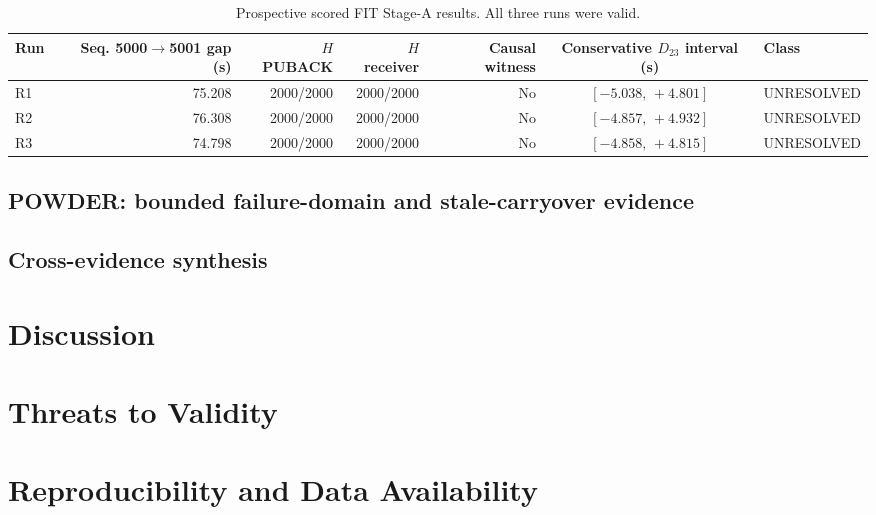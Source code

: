 \documentclass[journal]{IEEEtran}
\begin{document}
\begin{table}[t]
\centering
\caption{Prospective scored FIT Stage-A results. All three runs were valid.}
\label{tab:stagea}
\begin{tabular}{lrrrrcl}
\toprule
\textbf{Run} &
\textbf{Seq. 5000$\rightarrow$5001 gap (s)} &
\textbf{$H$ PUBACK} &
\textbf{$H$ receiver} &
\textbf{Causal witness} &
\textbf{Conservative $D_{23}$ interval (s)} &
\textbf{Class} \\
\midrule
R1 & 75.208 & 2000/2000 & 2000/2000 & No & $[-5.038,\,+4.801]$ & UNRESOLVED \\
R2 & 76.308 & 2000/2000 & 2000/2000 & No & $[-4.857,\,+4.932]$ & UNRESOLVED \\
R3 & 74.798 & 2000/2000 & 2000/2000 & No & $[-4.858,\,+4.815]$ & UNRESOLVED \\
\bottomrule
\end{tabular}
\end{table}


\subsection{POWDER: bounded failure-domain and stale-carryover evidence}

\subsection{Cross-evidence synthesis}

\section{Discussion}
\label{sec:discussion}

\section{Threats to Validity}
\label{sec:threats}

\section{Reproducibility and Data Availability}
\label{sec:repro}
\end{document}
